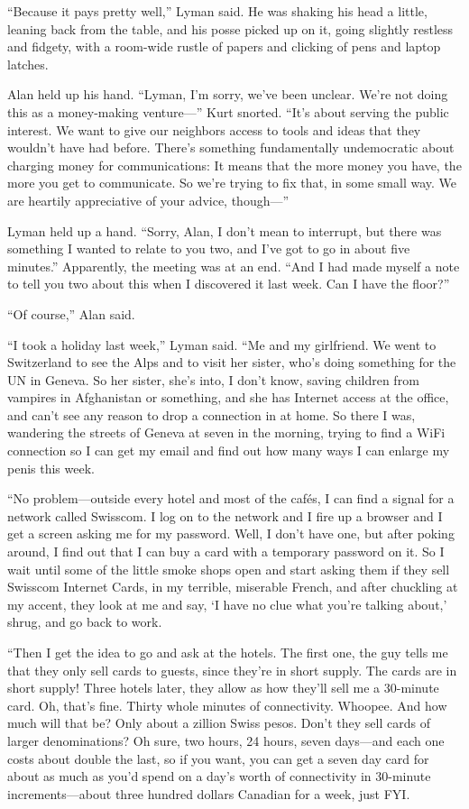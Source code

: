 ``Because it pays pretty well,'' Lyman said.  He was shaking his head
a little, leaning back from the table, and his posse picked up on it,
going slightly restless and fidgety, with a room-wide rustle of papers
and clicking of pens and laptop latches.

Alan held up his hand.  ``Lyman, I'm sorry, we've been unclear.  We're
not doing this as a money-making venture---'' Kurt snorted.  ``It's
about serving the public interest.  We want to give our neighbors
access to tools and ideas that they wouldn't have had before.  There's
something fundamentally undemocratic about charging money for
communications:  It means that the more money you have, the more you
get to communicate.  So we're trying to fix that, in some small way. 
We are heartily appreciative of your advice, though---''

Lyman held up a hand.  ``Sorry, Alan, I don't mean to interrupt, but
there was something I wanted to relate to you two, and I've got to go
in about five minutes.'' Apparently, the meeting was at an end.  ``And
I had made myself a note to tell you two about this when I discovered
it last week.  Can I have the floor?''

``Of course,'' Alan said.

``I took a holiday last week,'' Lyman said.  ``Me and my girlfriend. 
We went to Switzerland to see the Alps and to visit her sister, who's
doing something for the UN in Geneva.  So her sister, she's into, I
don't know, saving children from vampires in Afghanistan or something,
and she has Internet access at the office, and can't see any reason to
drop a connection in at home.  So there I was, wandering the streets
of Geneva at seven in the morning, trying to find a WiFi connection so
I can get my email and find out how many ways I can enlarge my penis
this week.

``No problem---outside every hotel and most of the caf\'{e}s, I can
find a signal for a network called Swisscom.  I log on to the network
and I fire up a browser and I get a screen asking me for my password. 
Well, I don't have one, but after poking around, I find out that I can
buy a card with a temporary password on it.  So I wait until some of
the little smoke shops open and start asking them if they sell
Swisscom Internet Cards, in my terrible, miserable French, and after
chuckling at my accent, they look at me and say, `I have no clue what
you're talking about,' shrug, and go back to work.

``Then I get the idea to go and ask at the hotels.  The first one, the
guy tells me that they only sell cards to guests, since they're in
short supply.  The cards are in short supply!  Three hotels later,
they allow as how they'll sell me a 30-minute card.  Oh, that's fine. 
Thirty whole minutes of connectivity.  Whoopee.  And how much will
that be?  Only about a zillion Swiss pesos.  Don't they sell cards of
larger denominations?  Oh sure, two hours, 24 hours, seven days---and
each one costs about double the last, so if you want, you can get a
seven day card for about as much as you'd spend on a day's worth of
connectivity in 30-minute increments---about three hundred dollars
Canadian for a week, just FYI.

